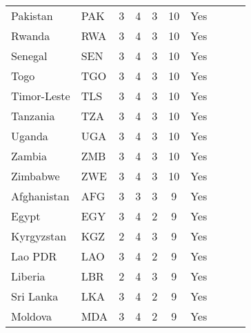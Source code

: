 \begin{longtable}{l l c c c c c c c c}
Pakistan                   & PAK           & 3          & 4                   & 3         & 10                & Yes             \\
Rwanda                     & RWA           & 3          & 4                   & 3         & 10                & Yes             \\
Senegal                    & SEN           & 3          & 4                   & 3         & 10                & Yes             \\
Togo                       & TGO           & 3          & 4                   & 3         & 10                & Yes             \\
Timor-Leste                & TLS           & 3          & 4                   & 3         & 10                & Yes             \\
Tanzania                   & TZA           & 3          & 4                   & 3         & 10                & Yes             \\
Uganda                     & UGA           & 3          & 4                   & 3         & 10                & Yes             \\
Zambia                     & ZMB           & 3          & 4                   & 3         & 10                & Yes             \\
Zimbabwe                   & ZWE           & 3          & 4                   & 3         & 10                & Yes             \\
Afghanistan                & AFG           & 3          & 3                   & 3         & 9                 & Yes             \\
Egypt                      & EGY           & 3          & 4                   & 2         & 9                 & Yes             \\
Kyrgyzstan                 & KGZ           & 2          & 4                   & 3         & 9                 & Yes             \\
Lao PDR                    & LAO           & 3          & 4                   & 2         & 9                 & Yes             \\
Liberia                    & LBR           & 2          & 4                   & 3         & 9                 & Yes             \\
Sri Lanka                  & LKA           & 3          & 4                   & 2         & 9                 & Yes             \\
Moldova                    & MDA           & 3          & 4                   & 2         & 9                 & Yes             \\

\end{longtable}
